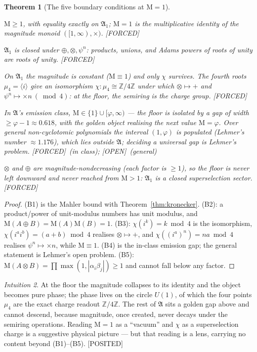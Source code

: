 \documentclass[11pt]{article}
\newcommand{\A}{𝔄}
\theoremstyle{plain}
\newtheorem{theorem}{Theorem}[section]
\theoremstyle{definition}
\theoremstyle{remark}
\newtheorem{intuition}[theorem]{Intuition}
\newcommand{\Forced}{\textcolor{forcedc}{[FORCED]}}
\newcommand{\Posited}{\textcolor{positedc}{[POSITED]}}
\newcommand{\Openq}{\textcolor{openc}{[OPEN]}}
\newcommand{\Mah}{\mathrm{M}}
\begin{document}
\begin{theorem}[The five boundary conditions at $\Mah=1$]\label{thm:boundary}
\leavevmode
\begin{description}[leftmargin=2.4em,style=nextline,itemsep=3pt]
\item[\normalfont(B1) Floor and identity.] $\Mah≥1$, with equality exactly on $\A_1$; $\Mah=1$ is the multiplicative identity of the magnitude monoid $([1,∞),×)$. \Forced
\item[\normalfont(B2) Sub-semiring.] $\A_1$ is closed under $⊕,⊗,ψ^{n}$: products, unions, and Adams powers of roots of unity are roots of unity. \Forced
\item[\normalfont(B3) Collapse to charge.] On $\A_1$ the magnitude is constant ($\Mah≡1$) and only $χ$ survives. The fourth roots $μ_4=⟨i⟩$ give an isomorphism $χ:μ_4≅ℤ/4ℤ$ under which $⊗↦{+}$ and $ψ^{n}↦{×n}\ (\bmod4)$: at the floor, the semiring is the charge group. \Forced
\item[\normalfont(B4) Isolation.] In $\A$'s emission class, $\Mah∈\{1\}∪[φ,∞)$ --- the floor is isolated by a gap of width $≥φ-1≈0.618$, with the golden object realising the next value $\Mah=φ$. Over general non-cyclotomic polynomials the interval $(1,φ)$ is populated (Lehmer's number $≈1.176$), which lies outside $\A$; deciding a universal gap is Lehmer's problem. \Forced\ (in class); \Openq\ (general)
\item[\normalfont(B5) One-way.] $⊗$ and $⊕$ are magnitude-nondecreasing (each factor is $≥1$), so the floor is never left downward and never reached from $\Mah>1$: $\A_1$ is a closed superselection sector. \Forced
\end{description}
\end{theorem}
\begin{proof}
(B1) is the Mahler bound with Theorem~\ref{thm:kronecker}. (B2): a product/power of unit-modulus numbers has unit modulus, and $\Mah(A⊕B)=\Mah(A)\Mah(B)=1$. (B3): $χ(i^{k})=k\bmod4$ is the isomorphism, $χ(i^ai^b)=(a+b)\bmod4$ realises $⊗↦{+}$, and $χ((i^a)^n)=na\bmod4$ realises $ψ^{n}↦{×n}$, while $\Mah≡1$. (B4) is the in-class emission gap; the general statement is Lehmer's open problem. (B5): $\Mah(A⊗B)=\prod\max(1,|α_iβ_j|)≥1$ and cannot fall below any factor.
\end{proof}

\begin{intuition}
At the floor the magnitude collapses to its identity and the object becomes pure phase; the phase lives on the circle $U(1)$, of which the four points $μ_4$ are the exact charge readout $ℤ/4ℤ$. The rest of $\A$ sits a golden gap above and cannot descend, because magnitude, once created, never decays under the semiring operations. Reading $\Mah=1$ as a ``vacuum'' and $χ$ as a superselection charge is a suggestive physical picture --- but that reading is a lens, carrying no content beyond (B1)--(B5). \Posited
\end{intuition}
\end{document}
